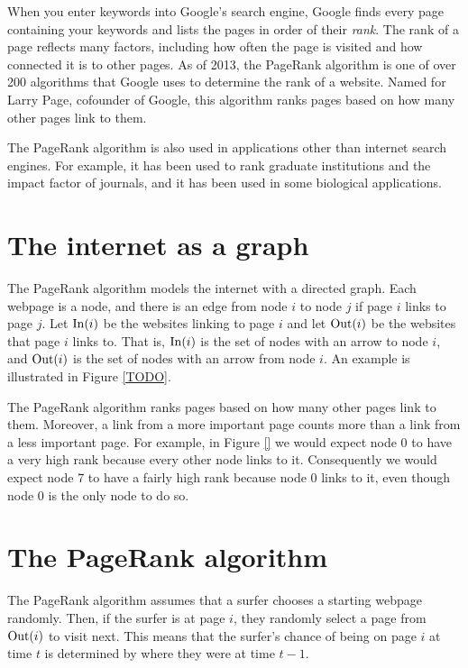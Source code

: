 \label{lab:PageRank}

When you enter keywords into Google's search engine, Google finds every page containing your keywords and lists the pages in order of their \emph{rank}.
The rank of a page reflects many factors, including how often the page is visited and how connected it is to other pages.
As of 2013, the PageRank algorithm is one of over 200 algorithms that Google uses to determine the rank of a website.
Named for Larry Page, cofounder of Google, this algorithm ranks pages based on how many other pages link to them.

The PageRank algorithm is also used in applications other than internet search engines.
For example, it has been used to rank graduate institutions and the impact factor of journals, and it has been used in some biological applications.

\section*{The internet as a graph}
The PageRank algorithm models the internet with a directed graph. 
Each webpage is a node, and there is an edge from node $i$ to node $j$ if page $i$ links to page $j$.
Let $\operatorname{In}(i)$ be the websites linking to page $i$ and let $\operatorname{Out}(i)$ be the websites that page $i$ links to. 
That is, $\operatorname{In}(i)$ is the set of nodes with an arrow to node $i$, and $\operatorname{Out}(i)$ is the set of nodes with an arrow from node $i$.
An example is illustrated in Figure \ref{TODO}.

The PageRank algorithm ranks pages based on how many other pages link to them.
Moreover, a link from a more important page counts more than a link from a less important page.
For example, in Figure \ref{} we would expect node 0 to have a very high rank because every other node links to it. 
Consequently we would expect node 7 to have a fairly high rank because node 0 links to it, even though node 0 is the only node to do so.

\section*{The PageRank algorithm}
The PageRank algorithm assumes that a surfer chooses a starting webpage randomly.
Then, if the surfer is at page $i$, they randomly select a page from $\operatorname{Out}(i)$ to visit next.
This means that the surfer's chance of being on page $i$ at time $t$ is determined by where they were at time $t-1$.


